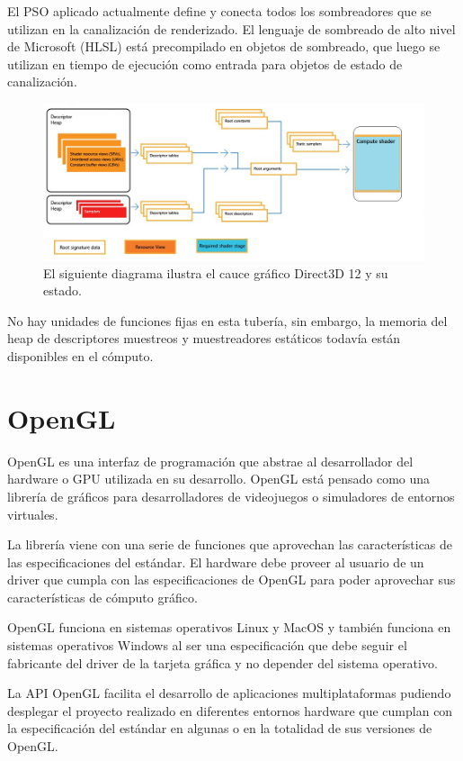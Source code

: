 \documentclass[a4paper, 17pt]{book}
\begin{document}
El PSO aplicado actualmente define y conecta todos los sombreadores que se utilizan en la canalización de renderizado.
El lenguaje de sombreado de alto nivel de Microsoft (HLSL) está precompilado en objetos de sombreado, que luego se utilizan
en tiempo de ejecución como entrada para objetos de estado de canalización.

\begin{figure}[hbt!]
    \centering
    \includegraphics[scale=0.40, keepaspectratio]{img/compute-pipeline.png}
    \caption{El siguiente diagrama ilustra el cauce gráfico Direct3D 12 y su estado.}
    \label{figura:khronos}
\end{figure}

No hay unidades de funciones fijas en esta tubería, sin embargo, la memoria del heap de descriptores muestreos y muestreadores
estáticos todavía están disponibles en el cómputo.

\section{OpenGL} 
\label{sec:OpenGL}

OpenGL es una interfaz de programación que abstrae al desarrollador del hardware o GPU utilizada en su desarrollo.
OpenGL está pensado como una librería de gráficos para desarrolladores de videojuegos o simuladores de entornos virtuales. 

La librería viene con una serie de funciones que aprovechan las características de las especificaciones del estándar.
El hardware debe proveer al usuario de un driver que cumpla con las especificaciones de OpenGL para poder aprovechar
sus características de cómputo gráfico. 

OpenGL funciona en sistemas operativos Linux y MacOS y también funciona en sistemas operativos Windows al ser una
especificación que debe seguir el fabricante del driver de la tarjeta gráfica y no depender del sistema operativo.

La API OpenGL facilita el desarrollo de aplicaciones multiplataformas pudiendo desplegar el proyecto realizado en
diferentes entornos hardware que cumplan con la especificación del estándar en algunas o en la totalidad de sus
versiones de OpenGL.
\end{document}
